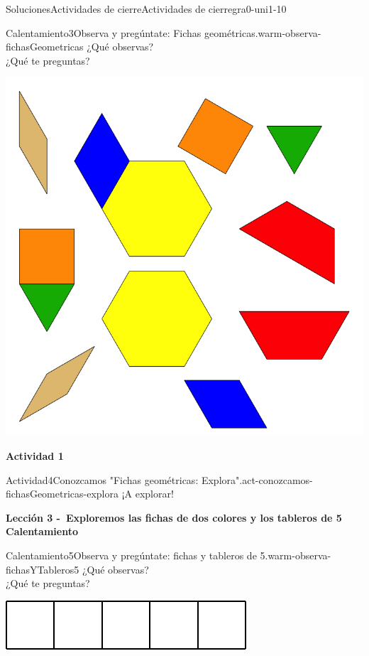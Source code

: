 \documentclass[twoside,10pt,]{article}
\begin{document}
\begin{solutions-section}{Soluciones}{Actividades de cierre}{}{Actividades de cierre}{}{}{gra0-uni1-10}
\begin{explorationsolution}{Calentamiento}{3}{Observa y pregúntate: Fichas geométricas.}{warm-observa-fichasGeometricas}
¿Qué observas?\\
 ¿Qué te preguntas?%
\begin{image}{0}{1}{0}{}%
\includegraphics[width=\linewidth]{external/svg-source/tikz-file-148141.pdf}
\end{image}%
\end{explorationsolution}%
\par\medskip
\noindent\textbf{\large{}\space\textperiodcentered\space{}Actividad 1}
\begin{activitysolution}{Actividad}{4}{Conozcamos "Fichas geométricas: Explora".}{act-conozcamos-fichasGeometricas-explora}%
¡A explorar!%
\end{activitysolution}%
\par\medskip
\noindent\textbf{\large{}\space\textperiodcentered\space{}Lección 3 -~Exploremos las fichas de dos colores y los tableros de 5\\
\space\textperiodcentered\space{}Calentamiento}
\begin{explorationsolution}{Calentamiento}{5}{Observa y pregúntate: fichas y tableros de 5.}{warm-observa-fichasYTableros5}%
¿Qué observas?\\
 ¿Qué te preguntas?%
\begin{sidebyside}{2}{0.05}{0.05}{0.1}%
\begin{sbspanel}{0.4}%
\includegraphics[width=\linewidth]{external/svg-source/tikz-file-147345.pdf}

\end{sbspanel}
\end{sidebyside}
\end{explorationsolution}
\end{solutions-section}
\end{document}
